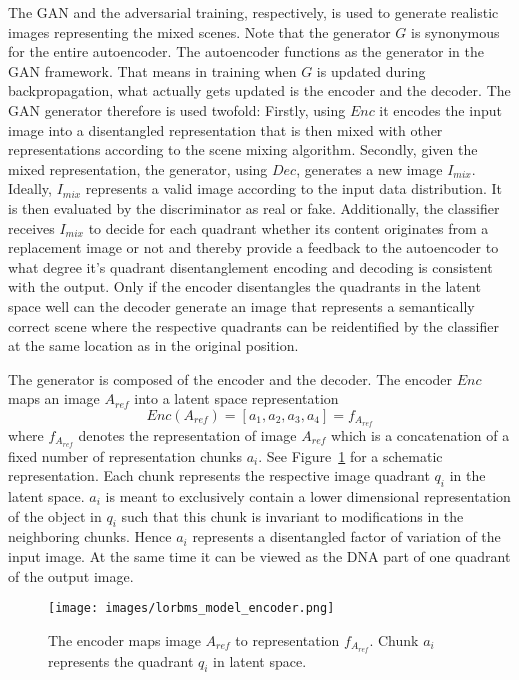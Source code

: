 \documentclass[a4paper,12pt]{report}
\begin{document}
The GAN and the adversarial training, respectively, is used to generate realistic images representing the mixed scenes. Note that the generator $G$ is synonymous for the entire autoencoder. The autoencoder functions as the generator in the GAN framework. That means in training when $G$ is updated during backpropagation, what actually gets updated is the encoder and the decoder. The GAN generator therefore is used twofold: Firstly, using $Enc$ it encodes the input image into a disentangled representation that is then mixed with other representations according to the scene mixing algorithm. Secondly, given the mixed representation, the generator, using $Dec$, generates a new image $I_{mix}$. Ideally, $I_{mix}$ represents a valid image according to the input data distribution. It is then evaluated by the discriminator as real or fake. Additionally, the classifier receives $I_{mix}$ to decide for each quadrant whether its content originates from a replacement image or not and thereby provide a feedback to the autoencoder to what degree it's quadrant disentanglement encoding and decoding is consistent with the output. Only if the encoder disentangles the quadrants in the latent space well can the decoder generate an image that represents a semantically correct scene where the respective quadrants can be reidentified by the classifier at the same location as in the original position. 

The generator is composed of the encoder and the decoder. The encoder $Enc$ maps an image $A_{ref}$ into a latent space representation
\begin{equation} \label{eq:2}
    Enc(A_{ref}) = [a_1, a_2, a_3, a_4] = f_{A_{ref}}
\end{equation}
where $f_{A_{ref}}$ denotes the representation of image $A_{ref}$ which is a concatenation of a fixed number of representation chunks $a_i$. See Figure~\ref{fig:encoder} for a schematic representation. Each chunk represents the respective image quadrant $q_i$ in the latent space. $a_i$ is meant to exclusively contain a lower dimensional representation of the object in $q_i$ such that this chunk is invariant to modifications in the neighboring chunks. Hence $a_i$ represents a disentangled factor of variation of the input image. At the same time it can be viewed as the DNA part of one quadrant of the output image.

\begin{figure}[ht]
\centering
\texttt{[image: images/lorbms\_model\_encoder.png]}
\caption{The encoder maps image $A_{ref}$ to representation $f_{A_{ref}}$. Chunk $a_i$ represents the quadrant $q_i$ in latent space.}
\label{fig:encoder}
\end{figure}
\end{document}
